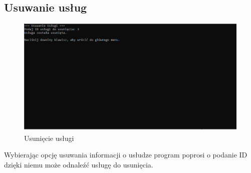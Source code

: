 \subsection{Usuwanie usług}
\begin{figure}[h]
    \centering
    \includegraphics[width=\textwidth]{UsuwanieUslug.png}
      \caption{Usunięcie usługi}
    \label{fig:example}
\end{figure}

Wybierając opcję usuwania informacji o usłudze program poprosi o podanie ID dzięki niemu może odnaleźć usługę do usunięcia.